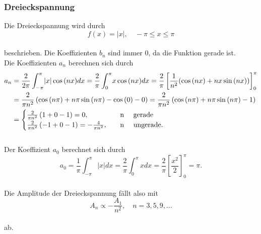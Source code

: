 \subsubsection{Dreieckspannung}
Die Dreieckspannung wird durch
\begin{equation*}
  f(x)= |x|, \quad -\pi \le x \le \pi
\end{equation*}
\\beschrieben.
Die Koeffizienten $b_{n}$ sind immer 0, da die Funktion gerade ist.
\\Die Koeffizienten $a_{n}$ berechnen sich durch
\begin{align*}
  a_{n}
  &=\frac{2}{2\pi} \int_{-\pi}^{\pi} \! |x| \cos{(nx)} dx
   =\frac{2}{\pi} \int_{0}^{\pi} \! x \cos{(nx)} dx
   =\frac{2}{\pi} \left[ \frac{1}{n^2}(\cos{(nx)}+nx \sin{(nx)}) \right]_{0}^{\pi}\\
  &=\frac{2}{\pi n^2} \left( \cos{(n \pi )}+n \pi \sin{(n \pi)} -  \cos{(0)} - 0\right)
   =\frac{2}{\pi n^2} \left( \cos{(n \pi )}+n \pi \sin{(n \pi)} -  1 \right)\\
  &=\begin{cases}
    \frac{2}{\pi n^2} \left( 1+ 0 -  1 \right)  = 0,                   \quad &\text{n  \quad gerade}\\
    \frac{2}{\pi n^2} \left( -1 +0 -  1 \right) = -\frac{4}{\pi n^2},  \quad &\text{n  \quad ungerade.}\\
  \end{cases}
\end{align*}
\\Der Koeffizient $a_{0}$ berechnet sich durch
\begin{equation*}
  a_{0}= \frac{1}{\pi} \int_{-\pi}^{\pi} \! |x| dx = \frac{2}{\pi} \int_{0}^{\pi} \! x dx = \frac{2}{\pi} \left[ \frac{x^2}{2} \right]_{0}^{\pi} = \pi.
\end{equation*}
\\Die Amplitude der Dreieckspannung fällt also mit
\begin{equation}
  A_{n} \propto -\frac{A_{1}}{n^2}, \quad n=3, 5, 9, ...
\end{equation}
\\ab.


